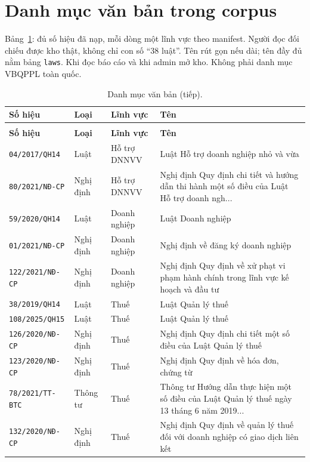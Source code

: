 \section{Danh mục văn bản trong corpus}

\boncau
{Bảng~\ref{tab:danh-muc-38}: đủ \soLuat{} số hiệu đã nạp, mỗi dòng một lĩnh vực
theo manifest.}
{Người đọc đối chiếu được kho thật, không chỉ con số ``38 luật''.}
{Tên rút gọn nếu dài; tên đầy đủ nằm bảng \texttt{laws}.}
{Khi đọc báo cáo và khi admin mở kho. Không phải danh mục VBQPPL toàn quốc.}

\begin{longtable}{p{3.3cm}p{2.0cm}p{2.6cm}p{5.6cm}}
\caption{Danh mục \soLuat{} văn bản quy phạm trong corpus.}
\label{tab:danh-muc-38}\\
\toprule
\textbf{Số hiệu} & \textbf{Loại} & \textbf{Lĩnh vực} & \textbf{Tên} \\
\midrule
\endfirsthead
\caption[]{Danh mục văn bản (tiếp).}\\
\toprule
\textbf{Số hiệu} & \textbf{Loại} & \textbf{Lĩnh vực} & \textbf{Tên} \\
\midrule
\endhead
\texttt{04/2017/QH14} & Luật & Hỗ trợ DNNVV & Luật Hỗ trợ doanh nghiệp nhỏ và vừa \\
\texttt{80/2021/NĐ-CP} & Nghị định & Hỗ trợ DNNVV & Nghị định Quy định chi tiết và hướng dẫn thi hành một số điều của Luật Hỗ trợ doanh ngh... \\
\texttt{59/2020/QH14} & Luật & Doanh nghiệp & Luật Doanh nghiệp \\
\texttt{01/2021/NĐ-CP} & Nghị định & Doanh nghiệp & Nghị định về đăng ký doanh nghiệp \\
\texttt{122/2021/NĐ-CP} & Nghị định & Doanh nghiệp & Nghị định Quy định về xử phạt vi phạm hành chính trong lĩnh vực kế hoạch và đầu tư \\
\texttt{38/2019/QH14} & Luật & Thuế & Luật Quản lý thuế \\
\texttt{108/2025/QH15} & Luật & Thuế & Luật Quản lý thuế \\
\texttt{126/2020/NĐ-CP} & Nghị định & Thuế & Nghị định Quy định chi tiết một số điều của Luật Quản lý thuế \\
\texttt{123/2020/NĐ-CP} & Nghị định & Thuế & Nghị định Quy định về hóa đơn, chứng từ \\
\texttt{78/2021/TT-BTC} & Thông tư & Thuế & Thông tư Hướng dẫn thực hiện một số điều của Luật Quản lý thuế ngày 13 tháng 6 năm 2019... \\
\texttt{132/2020/NĐ-CP} & Nghị định & Thuế & Nghị định Quy định về quản lý thuế đối với doanh nghiệp có giao dịch liên kết \\

\end{longtable}

